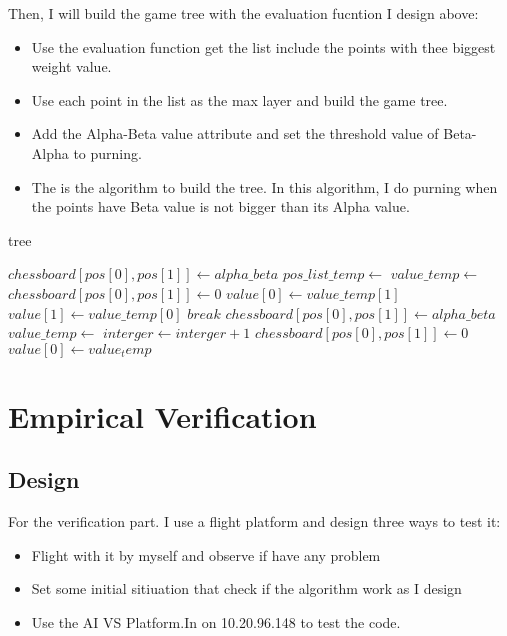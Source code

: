 \documentclass[conference,compsoc]{IEEEtran}
\begin{document}
  Then, I will build the game tree with the evaluation fucntion I design above:
  \begin{itemize}
    \item Use the evaluation function get the list include the points with thee biggest weight value.
    \item Use each point in the list as the max layer and build the game tree.
    \item Add the Alpha-Beta value attribute and set the threshold value of Beta-Alpha to purning.
    \item The  is the algorithm to build the tree. In this algorithm, I do purning when the points have Beta value is not bigger than its Alpha value.
  \end{itemize}
  \begin{algorithm}
    \caption{tree}
    \begin{algorithmic}[1]
      \State $ chessboard[pos[0],pos[1]] \gets alpha\_beta $
      \State $ pos\_list\_temp \gets$
      \State $ value\_temp\gets$
      \State $ chessboard[pos[0], pos[1]]\gets 0 $
              \State $ value[0]\gets value\_temp[1]$
              \EndIf
          \Else
              \State $ value[1]\gets value\_temp[0]$
              \EndIf
              \EndIf    
          \State $ break $
          \EndIf    
      \Else
      \State $ chessboard[pos[0], pos[1]]\gets alpha\_beta $
      \State $ value\_temp \gets$
      \State $ interger\gets interger + 1 $
      \State $ chessboard[pos[0], pos[1]]\gets 0 $
      \State $ value[0]\gets value_temp $
      \EndIf
    \EndFor
        \EndFunction
      \end{algorithmic}
  \end{algorithm}

\section{Empirical Verification}
\subsection{Design}
For the verification part. I use a flight platform and design three ways to test it:
\begin{itemize}
  \item Flight with it by myself and observe if have any problem
  \item Set some initial sitiuation that check if the algorithm work as I design
  \item Use the AI VS Platform.In on 10.20.96.148 to test the code.
\end{itemize}
\end{document}
